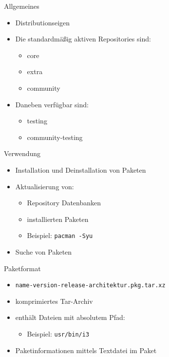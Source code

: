
\begin{slide}{Allgemeines}
	\begin{itemize}
		\item{Distributionseigen}
		\item{Die standardm\"{a}ßig aktiven Repositories sind:
			\begin{itemize}
				\item{core}
				\item{extra}
				\item{community}
			\end{itemize}
		}
		\item{Daneben verf\"{u}gbar sind:
			\begin{itemize}
				\item{testing}
				\item{community-testing}
			\end{itemize}
		}
	\end{itemize}
\end{slide}

\begin{slide}{Verwendung}
	\begin{itemize}
		\item{Installation und Deinstallation von Paketen}
		\item{Aktualisierung von:
			\begin{itemize}
				\item{Repository Datenbanken}
				\item{installierten Paketen}
				\item{Beispiel: \texttt{pacman -Syu}}
			\end{itemize}
		}
		\item{Suche von Paketen}
	\end{itemize}
\end{slide}

\begin{slide}{Paketformat}
	\begin{itemize}
		\item{\texttt{name-version-release-architektur.pkg.tar.xz}}
		\item{komprimiertes Tar-Archiv}
		\item{enth\"{a}lt Dateien mit absolutem Pfad:
			\begin{itemize}
				\item{Beispiel: \texttt{usr/bin/i3}}
			\end{itemize}
		}
		\item{Paketinformationen mittels Textdatei im Paket}
	\end{itemize}
\end{slide}

